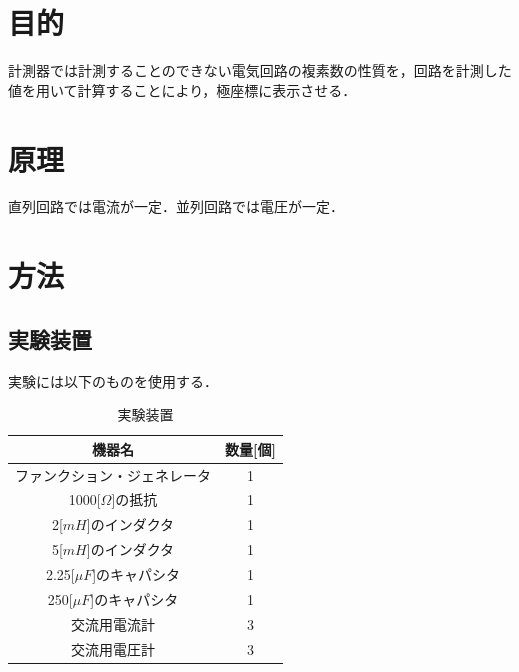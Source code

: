 \documentclass[11pt,dvipdfmx]{jarticle}
\begin{document}
\begin{jikkenTitle}
\end{jikkenTitle}


\section{目的}
計測器では計測することのできない電気回路の複素数の性質を，回路を計測した値を用いて計算することにより，極座標に表示させる．
\section{原理}
直列回路では電流が一定．並列回路では電圧が一定．
\section{方法}
\subsection{実験装置}
\space 実験には以下のものを使用する．
\begin{table}[hbtp]
  \centering
  \caption{実験装置}
  \label{tab:1}
  \begin{tabular}{cc}
    \hline
    機器名&数量[個]\\
    \hline
    ファンクション・ジェネレータ&1\\
    1000[$\Omega$]の抵抗&1\\
    2[$mH$]のインダクタ&1\\
    5[$mH$]のインダクタ&1\\
    2.25[$\mu F$]のキャパシタ&1\\
    250[$\mu F$]のキャパシタ&1\\
    交流用電流計&3\\
    交流用電圧計&3\\
    \hline
  \end{tabular}
\end{table}
\end{document}
